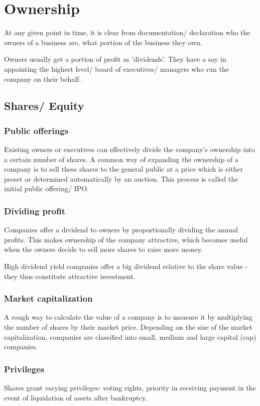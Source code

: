 \documentclass[oneside, article]{memoir}
\begin{document}
\section{Ownership}
At any given point in time, it is clear from documentation/ declaration who the owners of a business are, what portion of the business they own.

Owners usually get a portion of profit as 'dividends'. They have a say in appointing the highest level/ board of executives/ managers who run the company on their behalf.

\subsection{Shares/ Equity}
\subsubsection{Public offerings}
Existing owners or executives can effectively divide the company's ownership into a certain number of shares. A common way of expanding the ownership of a company is to sell these shares to the general public at a price which is either preset or determined automatically by an auction. This process is called the initial public offering/ IPO.

\subsubsection{Dividing profit}
Companies offer a dividend to owners by proportionally dividing the annual profits. This makes ownership of the company attractive, which becomes useful when the owners decide to sell more shares to raise more money.

High dividend yield companies offer a big dividend relative to the share value - they thus constitute attractive investment.

\subsubsection{Market capitalization}
A rough way to calculate the value of a company is to measure it by multiplying the number of shares by their market price. Depending on the size of the market capitalization, companies are classified into small, medium and large capital (cap) companies.

\subsubsection{Privileges}
Shares grant varying privileges: voting rights, priority in receiving payment in the event of liquidation of assets after bankruptcy.
\end{document}
